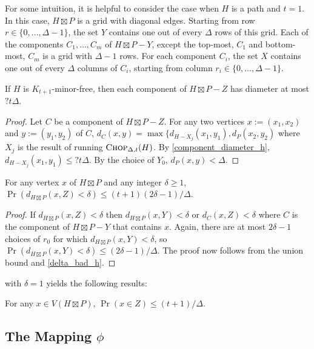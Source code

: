 \documentclass{patmorin}
\begin{document}
For some intuition, it is helpful to consider the case when $H$ is a path and $t=1$.  In this case, $H\boxtimes P$ is a grid with diagonal edges.  Starting from row $r\in\{0,\ldots,\Delta-1\}$, the set $Y$ contains one out of every $\Delta$ rows of this grid.  Each of the components $C_1,\ldots,C_m$ of $H\boxtimes P-Y$, except the top-most, $C_1$ and bottom-most, $C_m$ is a grid with $\Delta-1$ rows.  For each component $C_i$, the set $X$ contains one out of every $\Delta$ columns of $C_i$, starting from column $r_i\in\{0,\ldots,\Delta-1\}$. 

\begin{lem}\label{component_diameter}
  If $H$ is $K_{t+1}$-minor-free, then each component of $H\boxtimes P-Z$ has diameter at most $?t\Delta$.
\end{lem}

\begin{proof}
  Let $C$ be a component of $H\boxtimes P-Z$.  For any two vertices $x:=(x_1,x_2)$ and $y:=(y_1,y_2)$ of $C$, $d_{C}(x,y) = \max\{d_{H-X_j}(x_1,y_1),d_{P}(x_2,y_2)$ where $X_j$ is the result of running $\textsc{Chop}_{\Delta,t}(H)$. By \cref{component_diameter_h},  $d_{H-X_j}(x_1,y_1)\le ?t\Delta$.  By the choice of $Y_0$, $d_{P}(x,y)<\Delta$.
\end{proof}



\begin{lem}\label{delta_bad_product}
  For any vertex $x$ of $H\boxtimes P$ and any integer $\delta\ge 1$, $\Pr(d_{H\boxtimes P}(x,Z)< \delta)\le (t+1)(2\delta-1)/\Delta$.
\end{lem}

\begin{proof}
  If $d_{H\boxtimes P}(x,Z)<\delta$ then $d_{H\boxtimes P}(x,Y)<\delta$ or $d_{C}(x,Z)<\delta$ where $C$ is the component of $H\boxtimes P-Y$ that contains $x$.  Again, there are at most $2\delta-1$ choices of $r_0$ for which $d_{H\boxtimes P}(x,Y)<\delta$, so $\Pr(d_{H\boxtimes P}(x,Y)<\delta)\le (2\delta-1)/\Delta$.  The proof now follows from the union bound and \cref{delta_bad_h}.
\end{proof}

 with $\delta=1$ yields the following results:

\begin{cor}
  For any $x\in V(H\boxtimes P)$, $\Pr(x\in Z)\le (t+1)/\Delta$.
\end{cor}

\subsection{\boldmath The Mapping $\phi$}
\end{document}
